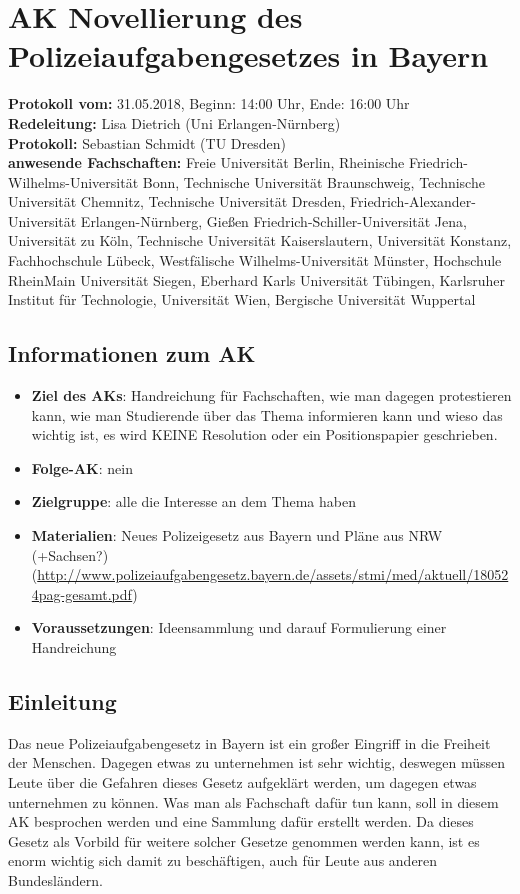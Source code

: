 
\section{AK Novellierung des Polizeiaufgabengesetzes in Bayern}

  \textbf{Protokoll vom:} 31.05.2018, %
  Beginn: 14:00 Uhr, %
  Ende: 16:00 Uhr \\ %
  \textbf{Redeleitung:} Lisa Dietrich (Uni Erlangen-Nürnberg) \\
  \textbf{Protokoll:} Sebastian Schmidt (TU Dresden) \\
  \textbf{anwesende Fachschaften:} Freie Universität Berlin, Rheinische Friedrich-Wilhelms-Universität Bonn, Technische Universität Braunschweig, Technische Universität Chemnitz, Technische Universität Dresden, Friedrich-Alexander-Universität Erlangen-Nürnberg, Gießen Friedrich-Schiller-Universität Jena, Universität zu Köln, Technische Universität Kaiserslautern, Universität Konstanz, Fachhochschule Lübeck, Westfälische Wilhelms-Universität Münster, Hochschule RheinMain Universität Siegen, Eberhard Karls Universität Tübingen, Karlsruher Institut für Technologie, Universität Wien, Bergische Universität Wuppertal

  \subsection*{Informationen zum AK}
    \begin{itemize}
      \item \textbf{Ziel des AKs}: Handreichung für Fachschaften, wie man dagegen protestieren kann, wie man Studierende über das Thema informieren kann und wieso das wichtig ist, es wird KEINE Resolution oder ein Positionspapier geschrieben.
      \item \textbf{Folge-AK}: nein
      \item \textbf{Zielgruppe}:  alle die Interesse an dem Thema haben
      \item \textbf{Materialien}: Neues Polizeigesetz aus Bayern und Pläne aus NRW (+Sachsen?) (\url{http://www.polizeiaufgabengesetz.bayern.de/assets/stmi/med/aktuell/180524pag-gesamt.pdf})
      \item \textbf{Voraussetzungen}: Ideensammlung und darauf Formulierung einer Handreichung
    \end{itemize}

  \subsection*{Einleitung}
    Das neue Polizeiaufgabengesetz in Bayern ist ein großer Eingriff in die Freiheit der Menschen. Dagegen etwas zu unternehmen ist sehr wichtig, deswegen müssen Leute über die Gefahren dieses Gesetz aufgeklärt werden, um dagegen etwas unternehmen zu können. Was man als Fachschaft dafür tun kann, soll in diesem AK besprochen werden und eine Sammlung dafür erstellt werden. Da dieses Gesetz als Vorbild für weitere solcher Gesetze genommen werden kann, ist es enorm wichtig sich damit zu beschäftigen, auch für Leute aus anderen Bundesländern.

